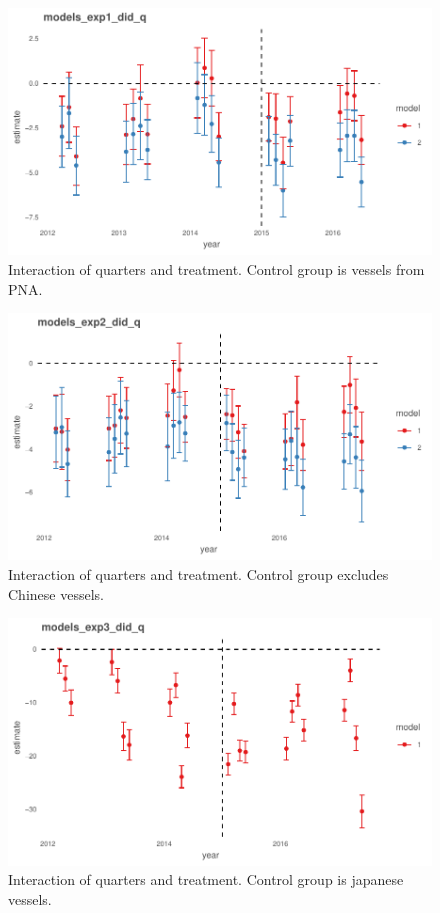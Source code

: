 \documentclass[11pt,english]{article}
\begin{document}
\begin{figure}
\centering
\includegraphics{Manuscript_files/figure-latex/unnamed-chunk-21-1.pdf}
\caption{\label{fig:unnamed-chunk-21}\label{fig:q2}Interaction of quarters
and treatment. Control group is vessels from PNA.}
\end{figure}

\begin{figure}
\centering
\includegraphics{Manuscript_files/figure-latex/unnamed-chunk-22-1.pdf}
\caption{\label{fig:unnamed-chunk-22}\label{fig:q3}Interaction of quarters
and treatment. Control group excludes Chinese vessels.}
\end{figure}

\begin{figure}
\centering
\includegraphics{Manuscript_files/figure-latex/unnamed-chunk-23-1.pdf}
\caption{\label{fig:unnamed-chunk-23}\label{fig:q4}Interaction of quarters
and treatment. Control group is japanese vessels.}
\end{figure}
\end{document}
